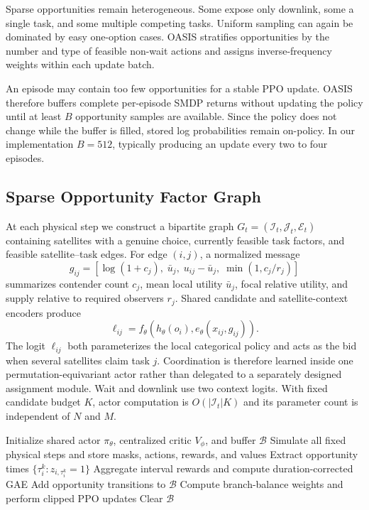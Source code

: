 \documentclass[letterpaper]{article}
\begin{document}
Sparse opportunities remain heterogeneous.  Some expose only downlink, some a single task, and some multiple competing tasks.  Uniform sampling can again be dominated by easy one-option cases.  OASIS stratifies opportunities by the number and type of feasible non-wait actions and assigns inverse-frequency weights within each update batch.

An episode may contain too few opportunities for a stable PPO update.  OASIS therefore buffers complete per-episode SMDP returns without updating the policy until at least $B$ opportunity samples are available.  Since the policy does not change while the buffer is filled, stored log probabilities remain on-policy.  In our implementation $B=512$, typically producing an update every two to four episodes.

\subsection{Sparse Opportunity Factor Graph}

At each physical step we construct a bipartite graph $G_t=(\mathcal I_t,\mathcal J_t,\mathcal E_t)$ containing satellites with a genuine choice, currently feasible task factors, and feasible satellite--task edges.  For edge $(i,j)$, a normalized message
\begin{equation}
 g_{ij}=\left[\log(1+c_j),\;\bar u_j,\;u_{ij}-\bar u_j,\;\min(1,c_j/r_j)\right]
\end{equation}
summarizes contender count $c_j$, mean local utility $\bar u_j$, focal relative utility, and supply relative to required observers $r_j$.  Shared candidate and satellite-context encoders produce
\begin{equation}
 \ell_{ij}=f_\theta\!\left(h_\theta(o_i),e_\theta(x_{ij},g_{ij})\right).
\end{equation}
The logit $\ell_{ij}$ both parameterizes the local categorical policy and acts as the bid when several satellites claim task $j$.  Coordination is therefore learned inside one permutation-equivariant actor rather than delegated to a separately designed assignment module.  Wait and downlink use two context logits.  With fixed candidate budget $K$, actor computation is $O(|\mathcal I_t|K)$ and its parameter count is independent of $N$ and $M$.

\begin{algorithm}[t]
\caption{OASIS training}
\label{alg:oasis}
\begin{algorithmic}[1]
\STATE Initialize shared actor $\pi_\theta$, centralized critic $V_\phi$, and buffer $\mathcal{B}$
  \STATE Simulate all fixed physical steps and store masks, actions, rewards, and values
    \STATE Extract opportunity times $\{\tau_i^k:z_{i,\tau_i^k}=1\}$
    \STATE Aggregate interval rewards and compute duration-corrected GAE
    \STATE Add opportunity transitions to $\mathcal{B}$
  \ENDFOR
    \STATE Compute branch-balance weights and perform clipped PPO updates
    \STATE Clear $\mathcal{B}$
  \ENDIF
\ENDFOR
\end{algorithmic}
\end{algorithm}
\end{document}
